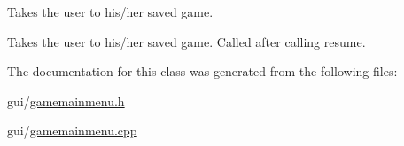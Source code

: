 \-Takes the user to his/her saved game. 

\-Takes the user to his/her saved game. \-Called after calling resume. 

\-The documentation for this class was generated from the following files\-:\begin{DoxyCompactItemize}
\item 
gui/\hyperlink{gamemainmenu_8h}{gamemainmenu.\-h}\item 
gui/\hyperlink{gamemainmenu_8cpp}{gamemainmenu.\-cpp}\end{DoxyCompactItemize}
